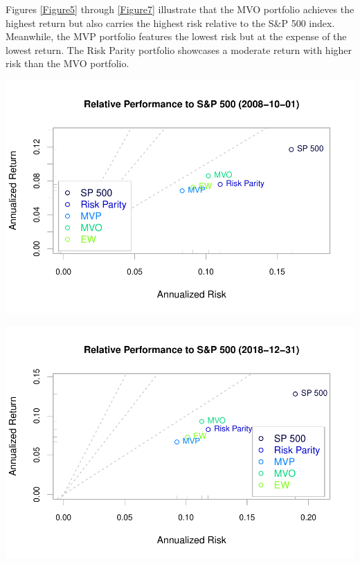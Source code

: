 \documentclass[12pt,preprint, authoryear]{elsarticle}
\let\origfigure\figure
\let\endorigfigure\endfigure
\renewenvironment{figure}[1][2] {
    \expandafter\origfigure\expandafter[H]
} {
    \endorigfigure
}
\numberwithin{equation}{section}
\numberwithin{figure}{section}
\numberwithin{table}{section}
\begin{document}
Figures \ref{Figure5} through \ref{Figure7} illustrate that the MVO
portfolio achieves the highest return but also carries the highest risk
relative to the S\&P 500 index. Meanwhile, the MVP portfolio features
the lowest risk but at the expense of the lowest return. The Risk Parity
portfolio showcases a moderate return with higher risk than the MVO
portfolio.

\begin{figure}[H]

{\centering \includegraphics{Finmetrics_Project_files/figure-latex/Figure5-1} 

}

\caption{Annualized Risk-return performance of portfolios relative to SP 500 since October 2008 \label{Figure5}}\label{fig:Figure5}
\end{figure}

\begin{figure}[H]

{\centering \includegraphics{Finmetrics_Project_files/figure-latex/Figure6-1} 

}

\caption{Annualized Risk-return performance of portfolios relative to SP 500 since December 2018 \label{Figure6}}\label{fig:Figure6}
\end{figure}
\end{document}
